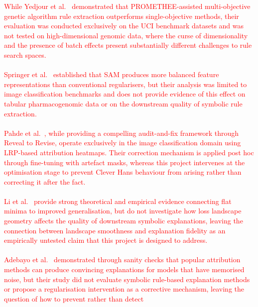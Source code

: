 \textcolor{red}{
While Yedjour et al.\ \cite{Yedjour2024} demonstrated that PROMETHEE-assisted multi-objective
genetic algorithm rule extraction outperforms single-objective methods, their evaluation was
conducted exclusively on the UCI benchmark datasets and was not tested on high-dimensional
genomic data, where the curse of dimensionality and the presence of batch effects present
substantially different challenges to rule search spaces.
\\\\
Springer et al.\ \cite{Springer2024} established that SAM produces more balanced feature
representations than conventional regularisers, but their analysis was limited to image
classification benchmarks and does not provide evidence of this effect on tabular pharmacogenomic
data or on the downstream quality of symbolic rule extraction.
\\\\
Pahde et al.\ \cite{Pahde2023}, while providing a compelling audit-and-fix framework through
Reveal to Revise, operate exclusively in the image classification domain using LRP-based
attribution heatmaps. Their correction mechanism is applied post hoc through fine-tuning with
artefact masks, whereas this project intervenes at the optimisation stage to prevent Clever Hans
behaviour from arising rather than correcting it after the fact.
\\\\
Li et al.\ \cite{Li2018} provide strong theoretical and empirical evidence connecting flat minima to
improved generalisation, but do not investigate how loss landscape geometry affects the quality of
downstream symbolic explanations, leaving the connection between landscape smoothness and
explanation fidelity as an empirically untested claim that this project is designed to address.
\\\\
Adebayo et al.\ \cite{Adebayo2018} demonstrated through sanity checks that popular attribution
methods can produce convincing explanations for models that have memorised noise, but their
study did not evaluate symbolic rule-based explanation methods or propose a regularisation
intervention as a corrective mechanism, leaving the question of how to prevent rather than detect
}
